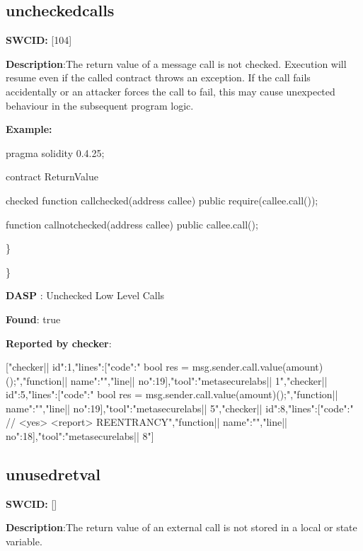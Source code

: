 \documentclass{article}
\begin{document}
\subsection{unchecked{\textunderscore}calls} 
\textbf{SWC{\textunderscore}ID:} [104]

\textbf{Description}:The return value of a message call is not checked. Execution will resume even if the called contract throws an exception. If the call fails accidentally or an attacker forces the call to fail, this may cause unexpected behaviour in the subsequent program logic.


\textbf{Example:} 
\begin{ffcode} 

pragma solidity 0.4.25;

contract ReturnValue {

checked
function callchecked(address callee) public {
    require(callee.call());
  }

  function callnotchecked(address callee) public {
    callee.call();
  }
}

\end{ffcode} 
\} 

\} 

\textbf{DASP} : Unchecked Low Level Calls

\textbf{Found}: true

\textbf{Reported by checker}: 
\begin{ffcode} 

[{"checker|\textunderscore| id":1,"lines":[{"code":"      bool res = msg.sender.call.value(amount)();\n","function|\textunderscore| name":"","line|\textunderscore| no":19}],"tool":"metasecurelabs|\textendash| 1"},{"checker|\textunderscore| id":5,"lines":[{"code":"      bool res = msg.sender.call.value(amount)();\n","function|\textunderscore| name":"","line|\textunderscore| no":19}],"tool":"metasecurelabs|\textendash| 5"},{"checker|\textunderscore| id":8,"lines":[{"code":"      // <yes> <report> REENTRANCY\n","function|\textunderscore| name":"","line|\textunderscore| no":18}],"tool":"metasecurelabs|\textendash| 8"}]
\end{ffcode} 
\subsection{unused{\textunderscore}retval} 
\textbf{SWC{\textunderscore}ID:} []

\textbf{Description}:The return value of an external call is not stored in a local or state variable.
\end{document}
